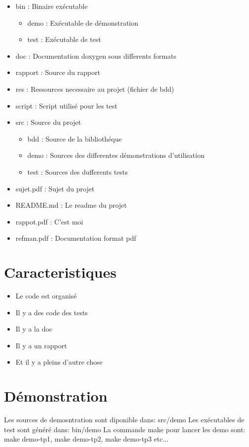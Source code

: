 \documentclass[a4paper]{article}
\begin{document}
\begin{itemize}
\item bin : Binaire exécutable
\begin{itemize}
  \item demo : Exécutable de démonstration
  \item test : Exécutable de test
\end{itemize}
\item doc : Documentation doxygen sous differents formats
\item rapport : Source du rapport
\item res : Ressources necessaire au projet (fichier de bdd)
\item script  : Script utilisé pour les test
\item src : Source du projet
\begin{itemize}
  \item bdd   : Source de la bibliothéque
  \item demo  : Sources des differentes démonstrations d'utilisation
  \item test  : Sources des dufferents tests
\end{itemize}

\item sujet.pdf  : Sujet du projet
\item README.md  : Le readme du projet
\item rappot.pdf : C'est moi
\item refman.pdf : Documentation format pdf
\end{itemize}

\section{Caracteristiques}

\begin{itemize}
	\item Le code est organisé
	\item Il y a des code des tests
	\item Il y a la doc
	\item Il y a un rapport
	\item Et il y a pleins d'autre chose
\end{itemize}

\section{Démonstration}

Les sources de demosntration sont diponible dans: src/demo
Les exécutables de test sont généré dans: bin/demo
La commande make pour lancer les demo sont: make demo-tp1, make demo-tp2, make demo-tp3 etc...
\end{document}
